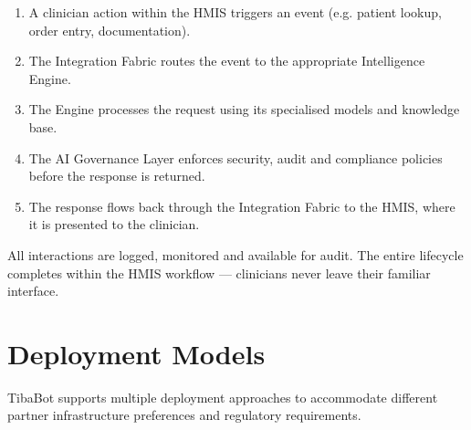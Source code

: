 \vspace{4mm}

\begin{enumerate}

\item A clinician action within the HMIS triggers an event (e.g. patient lookup, order entry, documentation).

\item The Integration Fabric routes the event to the appropriate Intelligence Engine.

\item The Engine processes the request using its specialised models and knowledge base.

\item The AI Governance Layer enforces security, audit and compliance policies before the response is returned.

\item The response flows back through the Integration Fabric to the HMIS, where it is presented to the clinician.

\end{enumerate}

All interactions are logged, monitored and available for audit. The entire lifecycle completes within the HMIS workflow — clinicians never leave their familiar interface.


\section{Deployment Models}

TibaBot supports multiple deployment approaches to accommodate different partner infrastructure preferences and regulatory requirements.

\vspace{4mm}

